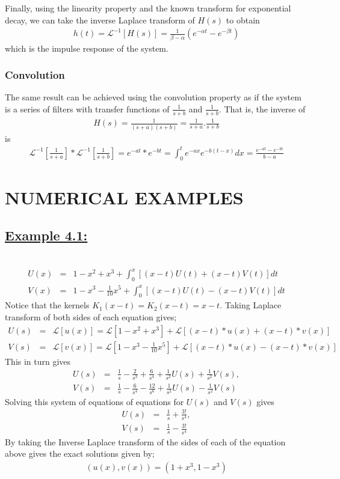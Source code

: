 \documentclass[11pt]{report}
\newcommand{\ubt}[1]{\textbf{\underline{#1}}}
\newcommand{\sps}{\\[0.2cm]}
\newcommand{\spn}[1]{\\[#1cm]}
\newcommand{\NI}{\noindent}
\newcommand{\example}[1]{\section*{\ubt{Example #1:}}{~}\spn{-1.7}}
\begin{document}
	\NI Finally, using the linearity property and the known transform for exponential decay, we can take the inverse Laplace transform of $H(s)$ to obtain
	\begin{eqnarray*}
		h(t)=\mathcal {L}^{-1}[H(s)] = \frac{1}{\beta - \alpha} \left( e^{-\alpha t} - e^{-\beta t}\right)
	\end{eqnarray*}
	which is the impulse response of the system.
	
	\subsection{Convolution}
	The same result can be achieved using the convolution property as if the system is a series of filters with transfer functions of $\frac{1}{s + b}$ and $\frac{1}{s + b}$. That is, the inverse of
	\begin{eqnarray*}
		H(s) = \frac{1}{(s + a)(s + b)} = \frac{1}{s + a} . \frac{1}{s + b}
	\end{eqnarray*}
	is
	\begin{eqnarray*}
		\mathcal {L}^{-1}[\frac{1}{s + a}] * \mathcal {L}^{-1}[\frac{1}{s + b}] = e^{-at} * e^{-bt} = \int_{0}^{t} e^{-ax} e^{-b(t-x)}dx = \frac{e^{-at} - e^{-bt}}{b - a}
	\end{eqnarray*}

	\chapter{NUMERICAL EXAMPLES}
	\example{4.1} 
	\begin{eqnarray*}
		U(x) &=& 1 - x^2 + x^3 + \int_{0}^{x} [(x - t) U(t) + (x - t)V(t)]dt\sps
		V(x) &=& 1 - x^3 - \frac{1}{10} x^5 +\int_{0}^{x} [(x - t) U(t) - (x - t)V(t)]dt
	\end{eqnarray*}
	Notice that the kernels $K_1(x - t) = K_2(x - t) = x - t$. Taking Laplace transform of both sides of each equation gives;
	\begin{eqnarray*}
		U(s) &=& \mathcal{L}[u(x)] = \mathcal{L}[1 - x^2 + x^3] + \mathcal{L}[(x - t) * u(x) + (x - t) * v(x)]\sps
			V(s) &=& \mathcal{L}[v(x)] = \mathcal{L}\left[1 - x^3 - \frac{1}{10}x^5\right] + \mathcal{L}[(x - t) * u(x) - (x - t) * v(x)]
	\end{eqnarray*}	
	This in turn gives
	\begin{eqnarray*}
		U(s) &=& \frac{1}{s} - \frac{2}{s^3} + \frac{6}{s^4} + \frac{1}{s^2}U(s) + \frac{1}{s^2}V(s),\sps
		V(s) &=& \frac{1}{s} - \frac{6}{s^4} - \frac{12}{s^6} + \frac{1}{s^2} U(s) - \frac{1}{s^2}V(s)
	\end{eqnarray*}
	Solving this system of equations of equations for $U(s)$ and $V(s)$ gives
	\begin{eqnarray*}
		U(s) &=& \frac{1}{s} + \frac{3!}{s^4},\sps
		V(s) &=& \frac{1}{s} - \frac{3!}{s^4}
	\end{eqnarray*}
	By taking the Inverse Laplace transform of the sides of each of the equation above gives the exact solutions given by;
	\begin{eqnarray*}
		(u(x), v(x)) = (1 + x^3, 1 - x^3)
	\end{eqnarray*}
\end{document}

